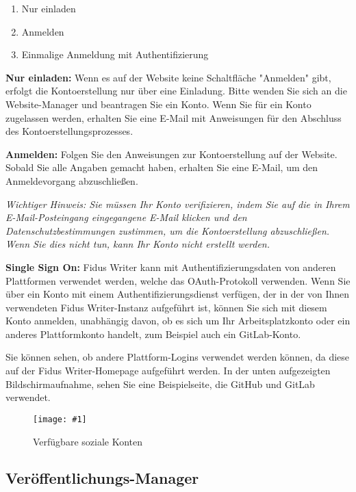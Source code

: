 \documentclass{article}
\newlength{\imgwidth}
\newcommand\scaledgraphics[2]{%
                
\settowidth{\imgwidth}{\texttt{[image: \#1]}}%
                
\setlength{\imgwidth}{\minof{\imgwidth}{#2\textwidth}}%
                
\texttt{[image: \#1]}%
                
}
\begin{document}
\begin{enumerate}
\item Nur einladen


\item Anmelden


\item Einmalige Anmeldung mit Authentifizierung


\end{enumerate}

\textbf{Nur einladen:} Wenn es auf der Website keine Schaltfläche "Anmelden" gibt, erfolgt die Kontoerstellung nur über eine Einladung. Bitte wenden Sie sich an die Website-Manager und beantragen Sie ein Konto. Wenn Sie für ein Konto zugelassen werden, erhalten Sie eine E-Mail mit Anweisungen für den Abschluss des Kontoerstellungsprozesses.


\textbf{Anmelden:} Folgen Sie den Anweisungen zur Kontoerstellung auf der Website. Sobald Sie alle Angaben gemacht haben, erhalten Sie eine E-Mail, um den Anmeldevorgang abzuschließen.


\emph{Wichtiger Hinweis: Sie müssen Ihr Konto verifizieren, indem Sie auf die in Ihrem E-Mail-Posteingang eingegangene E-Mail klicken und den Datenschutzbestimmungen zustimmen, um die Kontoerstellung abzuschließen. Wenn Sie dies nicht tun, kann Ihr Konto nicht erstellt werden.}


\textbf{Single Sign On:} Fidus Writer kann mit Authentifizierungsdaten von anderen Plattformen verwendet werden, welche das OAuth-Protokoll verwenden. Wenn Sie über ein Konto mit einem Authentifizierungsdienst verfügen, der in der von Ihnen verwendeten Fidus Writer-Instanz aufgeführt ist, können Sie sich mit diesem Konto anmelden, unabhängig davon, ob es sich um Ihr Arbeitsplatzkonto oder ein anderes Plattformkonto handelt, zum Beispiel auch ein GitLab-Konto.


Sie können sehen, ob andere Plattform-Logins verwendet werden können, da diese auf der Fidus Writer-Homepage aufgeführt werden. In der unten aufgezeigten Bildschirmaufnahme, sehen Sie eine Beispielseite, die GitHub und GitLab verwendet.

\begin{figure}
\scaledgraphics{3f36357f-61e1-4659-ba2a-735e243dfaf9.png}{1}
\caption*{Verfügbare soziale Konten}\label{F80718861}
\end{figure}


\subsection{Veröffentlichungs-Manager}\label{H558688}
\end{document}
